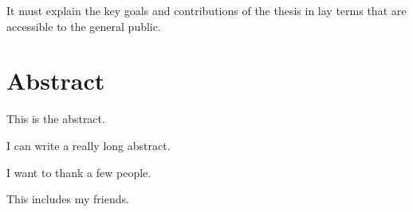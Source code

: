 \documentclass[
11pt, %
oneside, %
english, %
singlespacing, %
]{macthesis} %
\def\blankpage{%
      \clearpage%
      \thispagestyle{empty}%
      \addtocounter{page}{-1}%
      \null%
      \clearpage}
\begin{document}
  It must explain the key goals and contributions of the thesis in lay terms that are accessible to the general public.
\blankpage
\clearpage



\section*{\Huge Abstract}
\addchaptertocentry{\abstractname}
This is the abstract.

I can write a really long abstract.
\blankpage
\clearpage


  \begin{acknowledgements}
  \addchaptertocentry{\acknowledgementname} %
    I want to thank a few people.

    This includes my friends.
  \end{acknowledgements}
\blankpage
\clearpage


\tableofcontents %

\listoffigures %

\listoftables %

\end{document}
